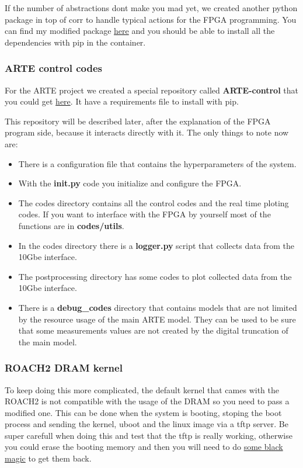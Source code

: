 If the number of abstractions dont make you mad yet, we created another python package in top of corr to handle typical actions for the FPGA programming. You can find my modified package \href{https://github.com/sebajor/calandigital}{here} and you should be able to install all the dependencies with pip in the container.


\subsubsection{ARTE control codes}
For the ARTE project we created a special repository called \textbf{ARTE-control} that you could get \href{https://github.com/sebajor/ARTE-control/}{here}. It have a requirements file to install with pip. 

This repository will be described later, after the explanation of the FPGA program side, because it interacts directly with it. The only things to note now are:
\begin{itemize}
    \item There is a configuration file that contains the hyperparameters of the system.
    \item With the \textbf{init.py} code you initialize and configure the FPGA.
    \item The codes directory contains all the control codes and the real time ploting codes. If you want to interface with the FPGA by yourself most of the functions are in \textbf{codes/utils}.
    \item In the codes directory there is a \textbf{logger.py} script that collects data from the 10Gbe interface.
    \item The postprocessing directory has some codes to plot collected data from the 10Gbe interface.
    \item There is a \textbf{debug\_codes} directory that contains models that are not limited by the resource usage of the main ARTE model. They can be used to be sure that some measurements values are not created by the digital truncation of the main model.
\end{itemize}



\subsubsection{ROACH2 DRAM kernel}
To keep doing this more complicated, the default kernel that cames with the ROACH2 is not compatible with the usage of the DRAM so you need to pass a modified one. This can be done when the system is booting, stoping the boot process and sending the kernel, uboot and the linux image via a tftp server. Be super carefull when doing this and test that the tftp is really working, otherwise you could erase the booting memory and then you will need to do \href{https://www.mail-archive.com/casper@lists.berkeley.edu/msg08171.html}{some black magic} to get them back.

